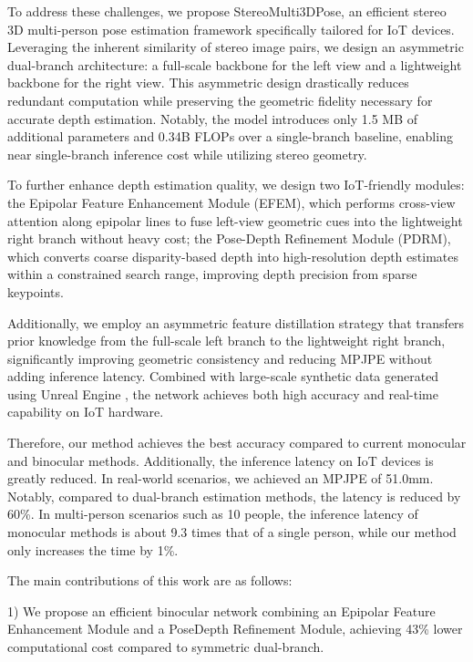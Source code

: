 \documentclass[journal]{IEEEtran}
\begin{document}
To address these challenges, we propose StereoMulti3DPose, an efficient stereo 3D multi-person pose estimation framework specifically tailored for IoT devices. Leveraging the inherent similarity of stereo image pairs, we design an asymmetric dual-branch architecture: a full-scale backbone for the left view and a lightweight backbone for the right view. This asymmetric design drastically reduces redundant computation while preserving the geometric fidelity necessary for accurate depth estimation. Notably, the model introduces only 1.5 MB of additional parameters and 0.34B FLOPs over a single-branch baseline, enabling near single-branch inference cost while utilizing stereo geometry.

To further enhance depth estimation quality, we design two IoT-friendly modules: the Epipolar Feature Enhancement Module (EFEM), which performs cross-view attention along epipolar lines to fuse left-view geometric cues into the lightweight right branch without heavy cost; the Pose-Depth Refinement Module (PDRM), which converts coarse disparity-based depth into high-resolution depth estimates within a constrained search range, improving depth precision from sparse keypoints.

Additionally, we employ an asymmetric feature distillation strategy  that transfers prior knowledge from the full-scale left branch to the lightweight right branch, significantly improving geometric consistency and reducing MPJPE without adding inference latency. Combined with large-scale synthetic data generated using Unreal Engine , the network achieves both high accuracy and real-time capability on IoT hardware.

Therefore, our method achieves the best accuracy compared to current monocular and binocular methods. Additionally, the inference latency on IoT devices is greatly reduced. In real-world scenarios, we achieved an MPJPE of 51.0mm. Notably, compared to dual-branch estimation methods, the latency is reduced by 60\%. In multi-person scenarios such as 10 people, the inference latency of monocular methods is about 9.3 times that of a single person, while our method only increases the time by 1\%.

The main contributions of this work are as follows:

1) We propose an efficient binocular network combining an Epipolar Feature Enhancement Module and a PoseDepth Refinement Module, achieving 43\% lower computational cost compared to symmetric dual-branch.
\end{document}
